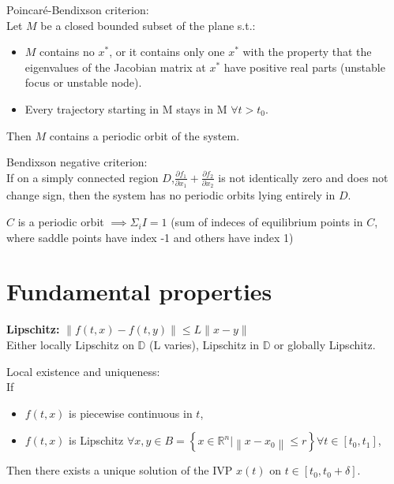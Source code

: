 \begin{tcolorbox}[colback=white, colframe=teal]
\begin{lemma}
    Poincaré-Bendixson criterion:\\
    Let $M$ be a closed bounded subset of the plane s.t.:
    \begin{itemize}[topsep=0pt]
        \item $M$ contains no $x^*$, or it
        contains only one $x^*$ with the property that
        the eigenvalues of the Jacobian matrix at $x^*$ have
        positive real parts (unstable focus or unstable node).
        \item Every trajectory starting in M stays in M $\forall t>t_0$.
    \end{itemize}
    Then $M$ contains a periodic orbit of the system.
\end{lemma}
\end{tcolorbox}

\begin{lemma}
    Bendixson negative criterion:\\
    If on a simply connected region $D$,$\frac{\partial f_{1}}{\partial x_{1}}+\frac{\partial f_{2}}{\partial x_{2}}$ is not identically zero and does not change sign, then the
    system has no periodic orbits lying entirely in $D$.
\end{lemma}

\begin{corollary}
    $C$ is a periodic orbit $\implies \Sigma_i I = 1$ (sum of indeces of equilibrium points in $C$, where saddle points have index -1 and others have index 1)
\end{corollary}

\section{Fundamental properties}
\begin{tcolorbox}[colback=white, colframe=teal]
\textbf{Lipschitz:} $\|f(t, x)-f(t, y)\| \leq L\|x-y\|$ \\
Either locally Lipschitz on $\mathbb{D}$ (L varies), Lipschitz in $\mathbb{D}$ or globally Lipschitz.
\end{tcolorbox}

\begin{theorem}
    Local existence and uniqueness:\\
    If
    \begin{itemize}[topsep=0pt]
        \item $f(t, x)$ is piecewise continuous in $t$,
        \item $f(t, x)$ is Lipschitz $\forall x, y \in B=\left\{x \in \mathbb{R}^{n} |\left\|x-x_{0}\right\| \leq r\right\} \forall t \in\left[t_{0}, t_{1}\right]$,
    \end{itemize}
    Then there exists a unique solution of the IVP $x(t)$
    on $t \in\left[t_{0}, t_{0}+\delta\right]$.
\end{theorem}

